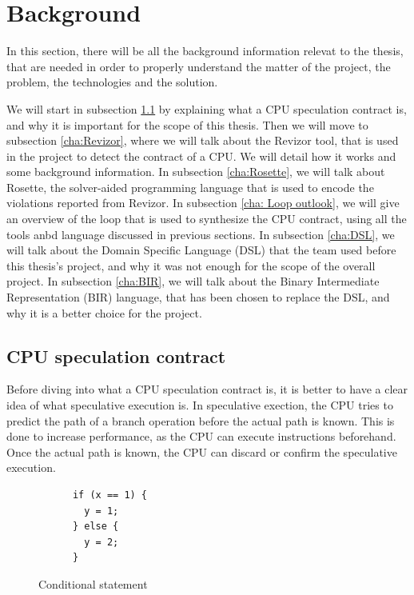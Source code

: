 \chapter{Background}
\label{cha:background}

In this section, there will be all the background information relevat to the thesis,
that are needed in order to properly understand the matter of the project, the problem,
the technologies and the solution.

We will start in subsection \ref{cha:CPU speculation contract} by explaining
what a CPU speculation contract is, and why it is important for the scope of this
thesis. Then we will move to subsection \ref{cha:Revizor}, where we will talk about
the Revizor tool, that is used in the project to detect the contract of a CPU. We
will detail how it works and some background information. In subsection
\ref{cha:Rosette}, we will talk about Rosette, the solver-aided programming
language that is used to encode the violations reported from Revizor. In subsection
\ref{cha: Loop outlook}, we will give an overview of the loop that is used to
synthesize the CPU contract, using all the tools anbd language discussed in previous
sections. In subsection \ref{cha:DSL}, we will talk about the Domain Specific Language
(DSL) that the team used before this thesis's project, and why it was not enough
for the scope of the overall project. In subsection \ref{cha:BIR}, we will talk
about the Binary Intermediate Representation (BIR) language, that has been chosen
to replace the DSL, and why it is a better choice for the project.

\section{CPU speculation contract}
\label{cha:CPU speculation contract} Before diving into what a CPU speculation
contract is, it is better to have a clear idea of what speculative execution is.
In speculative exection, the CPU tries to predict the path of a branch operation
before the actual path is known. This is done to increase performance, as the CPU
can execute instructions beforehand. Once the actual path is known, the CPU can discard
or confirm the speculative execution.

\begin{figure}
  \centering
  \begin{varwidth}
    {\linewidth} \begin{verbatim}
      if (x == 1) {
        y = 1;
      } else {
        y = 2;
      }
          \end{verbatim}
  \end{varwidth}
  \label{fig:snip1}
  \caption{Conditional statement}
\end{figure}

